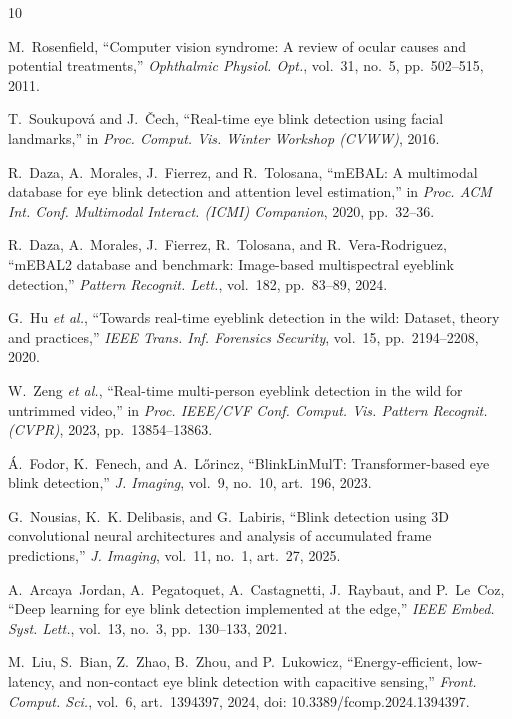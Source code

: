 \documentclass{IEEE_lsens}
\begin{document}
\begin{thebibliography}{10}

M.~Rosenfield, ``Computer vision syndrome: A review of ocular causes and
potential treatments,'' \emph{Ophthalmic Physiol. Opt.}, vol.~31, no.~5,
pp.~502--515, 2011.

T.~Soukupov\'{a} and J.~\v{C}ech, ``Real-time eye blink detection using
facial landmarks,'' in \emph{Proc. Comput. Vis. Winter Workshop (CVWW)}, 2016.

R.~Daza, A.~Morales, J.~Fierrez, and R.~Tolosana, ``mEBAL: A multimodal
database for eye blink detection and attention level estimation,'' in
\emph{Proc. ACM Int. Conf. Multimodal Interact. (ICMI) Companion}, 2020,
pp.~32--36.

R.~Daza, A.~Morales, J.~Fierrez, R.~Tolosana, and R.~Vera-Rodriguez,
``mEBAL2 database and benchmark: Image-based multispectral eyeblink
detection,'' \emph{Pattern Recognit. Lett.}, vol.~182, pp.~83--89, 2024.

G.~Hu \textit{et al.}, ``Towards real-time eyeblink detection in the wild:
Dataset, theory and practices,'' \emph{IEEE Trans. Inf. Forensics Security},
vol.~15, pp.~2194--2208, 2020.

W.~Zeng \textit{et al.}, ``Real-time multi-person eyeblink detection in the
wild for untrimmed video,'' in \emph{Proc. IEEE/CVF Conf. Comput. Vis.
Pattern Recognit. (CVPR)}, 2023, pp.~13854--13863.

\'{A}.~Fodor, K.~Fenech, and A.~L\H{o}rincz, ``BlinkLinMulT:
Transformer-based eye blink detection,'' \emph{J. Imaging}, vol.~9,
no.~10, art.~196, 2023.

G.~Nousias, K.~K. Delibasis, and G.~Labiris, ``Blink detection using 3D
convolutional neural architectures and analysis of accumulated frame
predictions,'' \emph{J. Imaging}, vol.~11, no.~1, art.~27, 2025.

A.~Arcaya~Jordan, A.~Pegatoquet, A.~Castagnetti, J.~Raybaut, and
P.~Le~Coz, ``Deep learning for eye blink detection implemented at the
edge,'' \emph{IEEE Embed. Syst. Lett.}, vol.~13, no.~3, pp.~130--133, 2021.

M.~Liu, S.~Bian, Z.~Zhao, B.~Zhou, and P.~Lukowicz,
``Energy-efficient, low-latency, and non-contact eye blink detection with
capacitive sensing,'' \emph{Front. Comput. Sci.}, vol.~6,
art.~1394397, 2024, doi: 10.3389/fcomp.2024.1394397.

\end{thebibliography}
\end{document}
